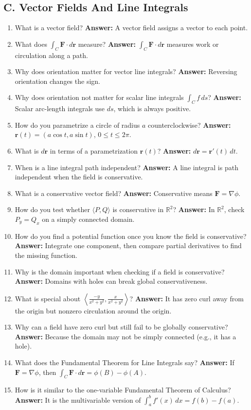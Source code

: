 \documentclass[11pt]{article}
\newcommand{\R}{\mathbb{R}}
\begin{document}
\subsection*{C. Vector Fields And Line Integrals}
\begin{enumerate}
\item What is a vector field? \textbf{Answer:} A vector field assigns a vector to each point.
\item What does $\int_C \mathbf F\cdot d\mathbf r$ measure? \textbf{Answer:} $\int_C\mathbf F\cdot d\mathbf r$ measures work or circulation along a path.
\item Why does orientation matter for vector line integrals? \textbf{Answer:} Reversing orientation changes the sign.
\item Why does orientation not matter for scalar line integrals $\int_C f\,ds$? \textbf{Answer:} Scalar arc-length integrals use $ds$, which is always positive.
\item How do you parametrize a circle of radius $a$ counterclockwise? \textbf{Answer:} $\mathbf r(t)=(a\cos t,a\sin t)$, $0\le t\le2\pi$.
\item What is $d\mathbf r$ in terms of a parametrization $\mathbf r(t)$? \textbf{Answer:} $d\mathbf r=\mathbf r'(t)\,dt$.
\item When is a line integral path independent? \textbf{Answer:} A line integral is path independent when the field is conservative.
\item What is a conservative vector field? \textbf{Answer:} Conservative means $\mathbf F=\nabla\phi$.
\item How do you test whether $\langle P,Q\rangle$ is conservative in $\R^2$? \textbf{Answer:} In $\R^2$, check $P_y=Q_x$ on a simply connected domain.
\item How do you find a potential function once you know the field is conservative? \textbf{Answer:} Integrate one component, then compare partial derivatives to find the missing function.
\item Why is the domain important when checking if a field is conservative? \textbf{Answer:} Domains with holes can break global conservativeness.
\item What is special about $\left\langle \frac{-y}{x^2+y^2},\frac{x}{x^2+y^2}\right\rangle$? \textbf{Answer:} It has zero curl away from the origin but nonzero circulation around the origin.
\item Why can a field have zero curl but still fail to be globally conservative? \textbf{Answer:} Because the domain may not be simply connected (e.g., it has a hole).
\item What does the Fundamental Theorem for Line Integrals say? \textbf{Answer:} If $\mathbf F=\nabla\phi$, then $\int_C\mathbf F\cdot d\mathbf r=\phi(B)-\phi(A)$.
\item How is it similar to the one-variable Fundamental Theorem of Calculus? \textbf{Answer:} It is the multivariable version of $\int_a^b f'(x)\,dx=f(b)-f(a)$.
\end{enumerate}
\end{document}
